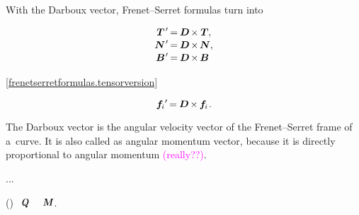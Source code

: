 \begin{otherlanguage}{russian}
With the Darboux vector, Frenet--Serret formulas turn into

\begin{align*}
\bm{T}{\hspace{.25ex}'} \hspace{-0.2ex} &= \hspace{-0.15ex} \bm{D} \hspace{-0.2ex} \times \bm{T} ,
\\[-0.2em]
\bm{N}{\hspace{.1ex}'} \hspace{-0.2ex} &= \hspace{-0.15ex} \bm{D} \hspace{-0.2ex} \times \hspace{-0.2ex} \bm{N} ,
\\[-0.2em]
\bm{B}{\hspace{.15ex}'} \hspace{-0.2ex} &= \hspace{-0.15ex} \bm{D} \hspace{-0.2ex} \times \hspace{-0.15ex} \bm{B}
\end{align*}

\noindent
{}   \eqref{frenetserretformulas.tensorversion}

\nopagebreak\vspace{-0.1em}\begin{equation}\label{frenetserretformulas.vectorversion}
\bm{f}_{\hspace{-0.1ex}i}{'} \hspace{-0.25ex} = \hspace{-0.15ex} \bm{D} \hspace{-0.2ex} \times \hspace{-0.15ex} \bm{f}_{\hspace{-0.1ex}i}
\hspace{.2ex} .
\end{equation}

The Darboux vector is the angular velocity vector of the Frenet--Serret frame of a~curve.
It is also called as angular momentum vector, because it is directly proportional to angular momentum \textcolor{magenta}{(really??)}.

...

\newpage

 ()      ~${\hspace{-0.1ex}\internalforce\hspace{.1ex}}$ ~~${\hspace{-0.1ex}\internalmoment}$.
  


\end{otherlanguage}
